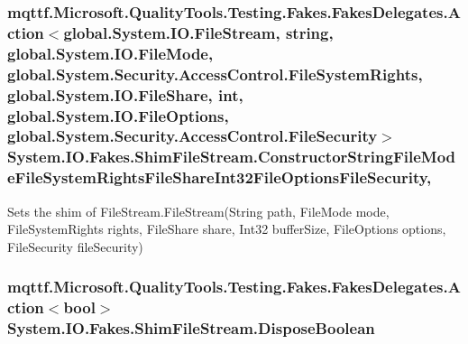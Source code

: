 \hypertarget{class_system_1_1_i_o_1_1_fakes_1_1_shim_file_stream_aa324bd3dff3df7409a7b1547113689b0}{
\subsubsection[{Constructor\-String\-File\-Mode\-File\-System\-Rights\-File\-Share\-Int32\-File\-Options\-File\-Security}]{\setlength{\rightskip}{0pt plus 5cm}mqttf.\-Microsoft.\-Quality\-Tools.\-Testing.\-Fakes.\-Fakes\-Delegates.\-Action$<$global.\-System.\-I\-O.\-File\-Stream, string, global.\-System.\-I\-O.\-File\-Mode, global.\-System.\-Security.\-Access\-Control.\-File\-System\-Rights, global.\-System.\-I\-O.\-File\-Share, int, global.\-System.\-I\-O.\-File\-Options, global.\-System.\-Security.\-Access\-Control.\-File\-Security$>$ System.\-I\-O.\-Fakes.\-Shim\-File\-Stream.\-Constructor\-String\-File\-Mode\-File\-System\-Rights\-File\-Share\-Int32\-File\-Options\-File\-Security\hspace{0.3cm}{\ttfamily [static]}, {\ttfamily [set]}}}\label{class_system_1_1_i_o_1_1_fakes_1_1_shim_file_stream_aa324bd3dff3df7409a7b1547113689b0}


Sets the shim of File\-Stream.\-File\-Stream(\-String path, File\-Mode mode, File\-System\-Rights rights, File\-Share share, Int32 buffer\-Size, File\-Options options, File\-Security file\-Security)

\hypertarget{class_system_1_1_i_o_1_1_fakes_1_1_shim_file_stream_a33330a39caa1498ce10e0e8f922e918a}{
\subsubsection[{Dispose\-Boolean}]{\setlength{\rightskip}{0pt plus 5cm}mqttf.\-Microsoft.\-Quality\-Tools.\-Testing.\-Fakes.\-Fakes\-Delegates.\-Action$<$bool$>$ System.\-I\-O.\-Fakes.\-Shim\-File\-Stream.\-Dispose\-Boolean\hspace{0.3cm}{\ttfamily [set]}}}\label{class_system_1_1_i_o_1_1_fakes_1_1_shim_file_stream_a33330a39caa1498ce10e0e8f922e918a}


